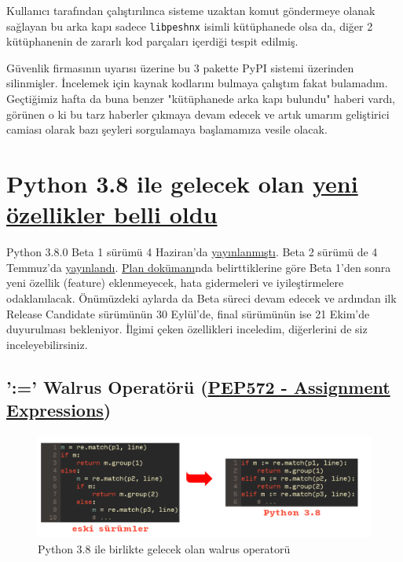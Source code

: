 \documentclass[11pt]{article}
\begin{document}
Kullanıcı tarafından çalıştırılınca sisteme uzaktan komut göndermeye olanak
sağlayan bu arka kapı sadece \texttt{libpeshnx} isimli kütüphanede olsa da, diğer 2
kütüphanenin de zararlı kod parçaları içerdiği tespit edilmiş.

Güvenlik firmasının uyarısı üzerine bu 3 pakette PyPI sistemi üzerinden
silinmişler. İncelemek için kaynak kodlarını bulmaya çalıştım fakat bulamadım.
Geçtiğimiz hafta da buna benzer "kütüphanede arka kapı bulundu" haberi vardı,
görünen o ki bu tarz haberler çıkmaya devam edecek ve artık umarım geliştirici
camiası olarak bazı şeyleri sorgulamaya başlamamıza vesile olacak.
\section{Python 3.8 ile gelecek olan \href{https://www.python.org/dev/peps/pep-0569/\#features-for-3-8}{yeni özellikler belli oldu}}
\label{sec:org23c783a}
Python 3.8.0 Beta 1 sürümü 4 Haziran'da \href{https://www.python.org/downloads/release/python-380b1/}{yayınlanmıştı}. Beta 2 sürümü de 4
Temmuz'da \href{https://www.python.org/downloads/release/python-380b2/}{yayınlandı}. \href{https://www.python.org/dev/peps/pep-0569/\#release-schedule}{Plan dokümanı}nda belirttiklerine göre Beta 1'den sonra
yeni özellik (feature) eklenmeyecek, hata gidermeleri ve iyileştirmelere
odaklanılacak. Önümüzdeki aylarda da Beta süreci devam edecek ve ardından ilk
Release Candidate sürümünün 30 Eylül'de, final sürümünün ise 21 Ekim'de
duyurulması bekleniyor. İlgimi çeken özellikleri inceledim, diğerlerini de siz
inceleyebilirsiniz.
\subsection{':=' Walrus Operatörü (\href{https://www.python.org/dev/peps/pep-0572/}{PEP572 - Assignment Expressions})}
\label{sec:org9c7e524}
\begin{figure}[htbp]
\centering
\includegraphics[width=.9\linewidth]{gorseller/python38-walrus-fixed.png}
\caption{Python 3.8 ile birlikte gelecek olan walrus operatorü}
\end{figure}
\end{document}
